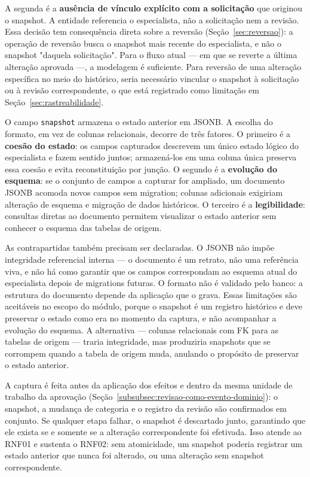 A segunda é a \textbf{ausência de vínculo explícito com a solicitação} 
que originou o snapshot. A entidade referencia o especialista, não a 
solicitação nem a revisão. Essa decisão tem consequência direta sobre a 
reversão (Seção~\ref{sec:reversao}): a operação de reversão busca o 
snapshot mais recente do especialista, e não o snapshot "daquela 
solicitação". Para o fluxo atual — em que se reverte a última alteração 
aprovada —, a modelagem é suficiente. Para reversão de uma alteração 
específica no meio do histórico, seria necessário vincular o snapshot 
à solicitação ou à revisão correspondente, o que está registrado como 
limitação em Seção~\ref{sec:rastreabilidade}. 

O campo \texttt{snapshot} armazena o estado anterior em JSONB. A escolha 
do formato, em vez de colunas relacionais, decorre de três fatores. O 
primeiro é a \textbf{coesão do estado}: os campos capturados descrevem um 
único estado lógico do especialista e fazem sentido juntos; armazená-los 
em uma coluna única preserva essa coesão e evita reconstituição por 
junção. O segundo é a \textbf{evolução do esquema}: se o conjunto de 
campos a capturar for ampliado, um documento JSONB acomoda novos campos 
sem migration; colunas adicionais exigiriam alteração de esquema e 
migração de dados históricos. O terceiro é a \textbf{legibilidade}: 
consultas diretas ao documento permitem visualizar o estado anterior 
sem conhecer o esquema das tabelas de origem.

As contrapartidas também precisam ser declaradas. O JSONB não impõe 
integridade referencial interna — o documento é um retrato, não uma 
referência viva, e não há como garantir que os campos correspondam ao 
esquema atual do especialista depois de migrations futuras. O formato 
não é validado pelo banco: a estrutura do documento depende da aplicação 
que o grava. Essas limitações são aceitáveis no escopo do módulo, porque 
o snapshot é um registro histórico e deve preservar o estado como 
era no momento da captura, e não acompanhar a evolução do esquema. A 
alternativa — colunas relacionais com FK para as tabelas de origem — 
traria integridade, mas produziria snapshots que se corrompem quando a 
tabela de origem muda, anulando o propósito de preservar o estado anterior.

A captura é feita antes da aplicação dos efeitos e dentro da mesma 
unidade de trabalho da aprovação (Seção~\ref{subsubsec:revisao-como-evento-dominio}): o 
snapshot, a mudança de categoria e o registro da revisão são confirmados 
em conjunto. Se qualquer etapa falhar, o snapshot é descartado junto, 
garantindo que ele exista se e somente se a alteração correspondente foi 
efetivada. Isso atende ao RNF01 e sustenta o RNF02: sem atomicidade, um 
snapshot poderia registrar um estado anterior que nunca foi alterado, ou 
uma alteração sem snapshot correspondente.

